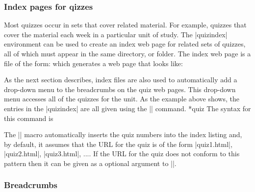 \documentclass[svgnames]{article}
\begin{document}
\subsubsection{Index pages for qizzes}\label{SS:index}


  Most quizzes occur in sets that cover related material. For example,
  quizzes that cover the material each week in a particular unit of
  study. The \LatexCode|quizindex| environment can be used to create an
  index web page for related sets of quizzes, all of which must appear in the same
  directory, or folder. The index web page is a \WebQuiz file of the
  form:
  which generates a web page that looks like:

  As the next section describes, index files are also used to
  automatically add a drop-down menu to the breadcrumbs on the quiz web
  pages. This drop-down menu accesses all of the quizzes for the unit.
  As the example above shows, the entries in the \LatexCode|quizindex| are all
  given using the \LatexCode|\quiz| command.
  *{quiz}
  The syntax for this command is

  \begin{latexcode}
  \end{latexcode}

  \noindent The \LatexCode|\quiz| macro automatically inserts the quiz
  numbers into the index listing and, by default, it assumes that the
  URL for the quiz is of the form \BashCode|quiz1.html|,
  \BashCode|quiz2.html|, \BashCode|quiz3.html|, .... If the URL for the quiz
  does not conform to this pattern then it can be given as a optional
  argument to \LatexCode|\quiz|.

  \subsubsection{Breadcrumbs}\label{SS:breadcrumbs}
\end{document}
